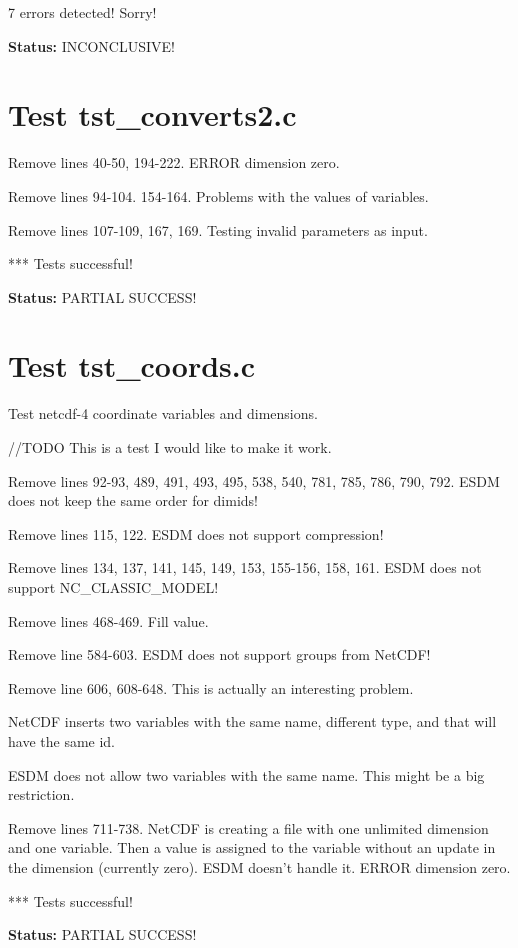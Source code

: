 7 errors detected! Sorry!

{\bf \large Status: } INCONCLUSIVE!

\section{Test tst\_converts2.c}

Remove lines 40-50, 194-222. ERROR dimension zero.

Remove lines 94-104. 154-164. Problems with the values of variables.

Remove lines 107-109, 167, 169. Testing invalid parameters as input.

*** Tests successful!

{\bf \large Status: } PARTIAL SUCCESS!

\section{Test tst\_coords.c}

Test netcdf-4 coordinate variables and dimensions.

//TODO This is a test I would like to make it work.

Remove lines 92-93, 489, 491, 493, 495, 538, 540, 781, 785, 786, 790, 792. ESDM does not keep the same order for dimids!

Remove lines 115, 122. ESDM does not support compression!

Remove lines 134, 137, 141, 145, 149, 153, 155-156, 158, 161. ESDM does not support NC\_CLASSIC\_MODEL!

Remove lines 468-469. Fill value.

Remove line 584-603. ESDM does not support groups from NetCDF!

Remove line 606, 608-648. This is actually an interesting problem.

NetCDF inserts two variables with the same name, different type, and that will have the same id.

ESDM does not allow two variables with the same name. This might be a big restriction.

Remove lines 711-738. NetCDF is creating a file with one unlimited dimension and one variable. Then a value is assigned to the variable without an update in the dimension (currently zero). ESDM doesn't handle it. ERROR dimension zero.

*** Tests successful!

{\bf \large Status: } PARTIAL SUCCESS!

